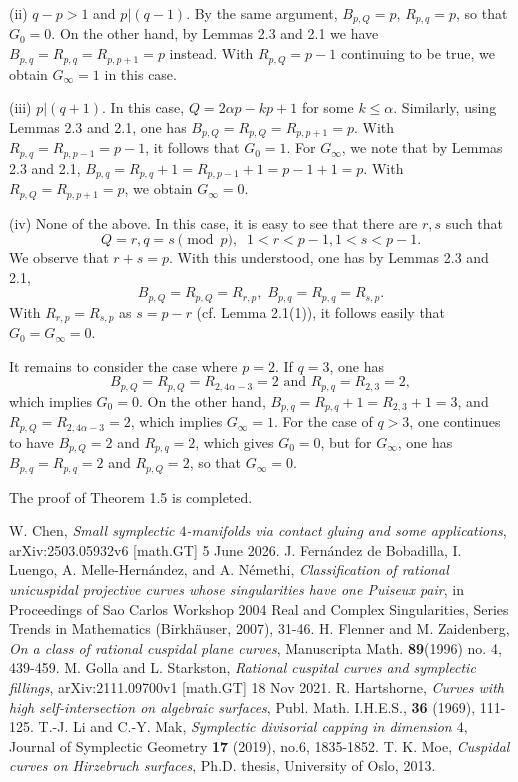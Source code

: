 \documentclass[11pt]{amsart}
\theoremstyle{plain}
\numberwithin{theorem}{section}
\theoremstyle{definition}
\begin{document}
\vspace{2mm}

(ii) $q-p>1$ and $p | (q-1)$. By the same argument, $B_{p,Q}=p$, $R_{p,q}=p$, so that $G_0=0$.
On the other hand, by Lemmas 2.3 and 2.1 we have $B_{p,q}=R_{p,q}=R_{p,p+1}=p$ instead. With
$R_{p,Q}=p-1$ continuing to be true, we obtain $G_\infty =1$ in this case.

\vspace{2mm}

(iii) $p | (q+1)$. In this case, $Q=2\alpha p-kp+1$ for some $k\leq \alpha$. Similarly, using 
Lemmas 2.3 and 2.1, one has $B_{p,Q}=R_{p,Q}=R_{p,p+1}=p$. With $R_{p,q}=R_{p,p-1}=p-1$, it follows that $G_0=1$. For $G_\infty$, we note that by Lemmas 2.3 and 2.1, $B_{p,q}=R_{p,q}+1=R_{p,p-1}+1=p-1+1=p$.
With $R_{p,Q}=R_{p,p+1}=p$, we obtain $G_\infty=0$.

\vspace{2mm}

(iv) None of the above. In this case, it is easy to see that there are $r,s$ such that
$$
Q=r, q=s \pmod{p}, \;\; 1<r<p-1, 1<s<p-1.
$$
We observe that $r+s=p$. With this understood, one has by Lemmas 2.3 and 2.1,
$$
B_{p,Q}=R_{p,Q}=R_{r,p}, \; B_{p,q}=R_{p,q}=R_{s,p}. 
$$
With $R_{r,p}=R_{s,p}$ as $s=p-r$ (cf. Lemma 2.1(1)), it follows easily that $G_0=G_\infty=0$. 

It remains to consider the case where $p=2$. If $q=3$, one has 
$$
B_{p,Q}=R_{p,Q}=R_{2,4\alpha-3}=2 \mbox{ and } R_{p,q}=R_{2,3}=2,
$$
which implies $G_0=0$. On the other hand, $B_{p,q}=R_{p,q}+1=R_{2,3}+1=3$, and $R_{p,Q}=R_{2,4\alpha-3}=2$, which implies $G_\infty=1$. For the case of $q>3$, one continues to have $B_{p,Q}=2$ and  
$R_{p,q}=2$, which gives $G_0=0$, but for $G_\infty$, one has $B_{p,q}=R_{p,q}=2$ and 
$R_{p,Q}=2$, so that $G_\infty=0$. 

The proof of Theorem 1.5 is completed. 


\begin{thebibliography}{}
 W. Chen, {\em Small symplectic $4$-manifolds via contact gluing and some applications}, 
arXiv:2503.05932v6 [math.GT] 5 June 2026.
 J. Fernández de Bobadilla, I. Luengo, A. Melle-Hernández, and A. Némethi, {\em Classification of rational unicuspidal projective curves whose singularities have one Puiseux pair}, in Proceedings of Sao Carlos Workshop 2004 Real and Complex Singularities, Series Trends in Mathematics (Birkhäuser, 2007), 31-46.
 H. Flenner and M. Zaidenberg, {\em On a class of rational cuspidal plane curves},
Manuscripta Math. {\bf 89}(1996) no. 4, 439-459.
 M. Golla and L. Starkston, {\em Rational cuspital curves and symplectic fillings}, arXiv:2111.09700v1 [math.GT] 18 Nov 2021.
 R. Hartshorne, {\em Curves with high self-intersection on algebraic surfaces}, 
Publ. Math. I.H.E.S., {\bf 36} (1969), 111-125.
 T.-J. Li and C.-Y. Mak, {\em Symplectic divisorial capping in dimension $4$}, 
Journal of Symplectic Geometry {\bf 17} (2019), no.6, 1835-1852.
 T. K. Moe, {\em Cuspidal curves on Hirzebruch surfaces}, Ph.D. thesis, University of Oslo, 2013. 
\end{thebibliography}
\end{document}
